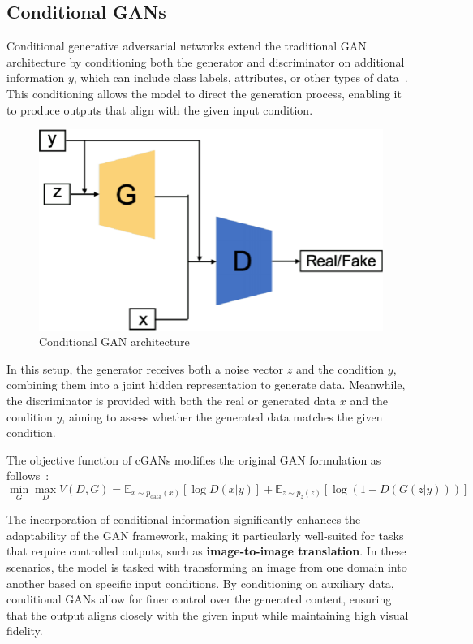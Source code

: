 \documentclass[12pt,DIV14,BCOR12mm,a4paper,footinclude=false,headinclude,parskip=half-,twoside,openright,cleardoublepage=empty,toc=index,bibliography=totoc,listof=totoc]{scrreprt}
\numberwithin{equation}{chapter}
\begin{document}
\subsection{Conditional GANs}
Conditional generative adversarial networks extend the traditional GAN architecture by conditioning both the generator and discriminator on additional information \( y \), which can include class labels, attributes, or other types of data~\cite{devries2019evaluation}. This conditioning allows the model to direct the generation process, enabling it to produce outputs that align with the given input condition. 
\begin{figure}
	\centering
	\includegraphics[scale=.9]{../media/Conditional-GAN-architecture.png}
	\caption{Conditional GAN architecture~\cite{eckerli2021generative}}
	\label{cGAN}
\end{figure}
In this setup, the generator receives both a noise vector \( z \) and the condition \( y \), combining them into a joint hidden representation to generate data. Meanwhile, the discriminator is provided with both the real or generated data \( x \) and the condition \( y \), aiming to assess whether the generated data matches the given condition.

The objective function of cGANs modifies the original GAN formulation as follows~\cite{gauthier2014conditional}:
\begin{equation}
\min_{G} \max_{D} V(D, G) = \mathbb{E}_{x \sim p_{\text{data}}(x)} [\log D(x|y)] + \mathbb{E}_{z \sim p_z(z)} [\log(1 - D(G(z|y)))]
\end{equation}

The incorporation of conditional information significantly enhances the adaptability of the GAN framework, making it particularly well-suited for tasks that require controlled outputs, such as \textbf{image-to-image translation}. In these scenarios, the model is tasked with transforming an image from one domain into another based on specific input conditions. By conditioning on auxiliary data, conditional GANs allow for finer control over the generated content, ensuring that the output aligns closely with the given input while maintaining high visual fidelity.
\end{document}
